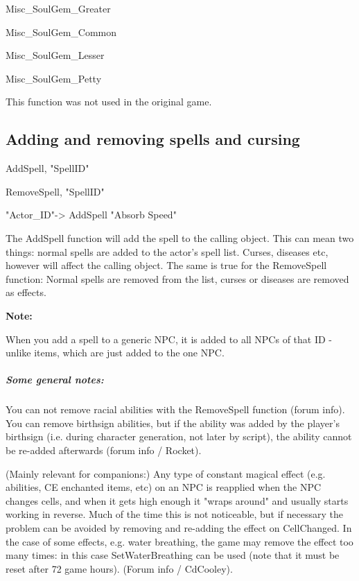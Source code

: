 Misc\_SoulGem\_Greater

Misc\_SoulGem\_Common

Misc\_SoulGem\_Lesser

Misc\_SoulGem\_Petty

This function was not used in the original game.

\hypertarget{adding-and-removing-spells-and-cursing}{%
\subsection{\texorpdfstring{\hfill\break
Adding and removing spells and cursing
}{ Adding and removing spells and cursing }}\label{adding-and-removing-spells-and-cursing}}

AddSpell, "SpellID"

RemoveSpell, "SpellID"

"Actor\_ID"-> AddSpell "Absorb Speed"

The AddSpell function will add the spell to the calling object. This can
mean two things: normal spells are added to the actor's spell list.
Curses, diseases etc, however will affect the calling object. The same
is true for the RemoveSpell function: Normal spells are removed from the
list, curses or diseases are removed as effects.

\textbf{Note:}

When you add a spell to a generic NPC, it is added to all NPCs of that
ID - unlike items, which are just added to the one NPC.

\hypertarget{some-general-notes}{%
\subparagraph{Some general notes:}\label{some-general-notes}}

You can not remove racial abilities with the RemoveSpell function (forum
info). You can remove birthsign abilities, but if the ability was added
by the player's birthsign (i.e. during character generation, not later
by script), the ability cannot be re-added afterwards (forum info /
Rocket).

(Mainly relevant for companions:) Any type of constant magical effect
(e.g. abilities, CE enchanted items, etc) on an NPC is reapplied when
the NPC changes cells, and when it gets high enough it "wraps around"
and usually starts working in reverse. Much of the time this is not
noticeable, but if necessary the problem can be avoided by removing and
re-adding the effect on CellChanged. In the case of some effects, e.g.
water breathing, the game may remove the effect too many times: in this
case SetWaterBreathing can be used (note that it must be reset after 72
game hours). (Forum info / CdCooley).


